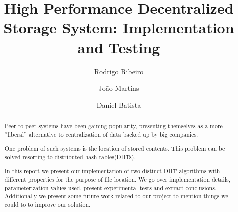 \documentclass[sigconf]{acmart}
\begin{document}
\title{High Performance Decentralized Storage System: Implementation and Testing}

\author{Rodrigo Ribeiro}

\author{João Martins}

\author{Daniel Batista}

\renewcommand{\shortauthors}{Rodrigo Ribeiro, João Martins, and Daniel Batista.}

\begin{abstract}
Peer-to-peer systems have been gaining popularity, presenting themselves as a more ``liberal'' alternative to centralization of data backed up by big companies.

One problem of such systems is the location of stored contents. This problem can be solved resorting to distributed hash tables(DHTs). 

In this report we present our implementation of two distinct DHT algorithms with different properties for the purpose of file location. We go over implementation details, parameterization values used, present experimental tests and extract conclusions. Additionally we present some future work related to our project to mention things we could to to improve our solution.
  
\end{abstract}

\maketitle
\end{document}
